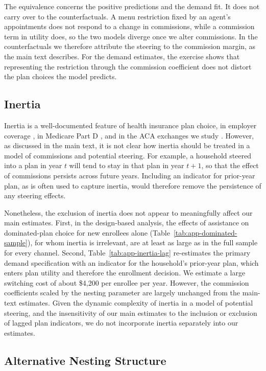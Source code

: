 \documentclass[12pt]{article}
\begin{document}
The equivalence concerns the positive predictions and the demand fit. It does not carry over to the counterfactuals. A menu restriction fixed by an agent's appointments does not respond to a change in commissions, while a commission term in utility does, so the two models diverge once we alter commissions. In the counterfactuals we therefore attribute the steering to the commission margin, as the main text describes. For the demand estimates, the exercise shows that representing the restriction through the commission coefficient does not distort the plan choices the model predicts.

\subsection{Inertia}
\label{app:inertia}

Inertia is a well-documented feature of health insurance plan choice, in employer coverage \citep{handel2013}, in Medicare Part D \citep{polyakova2016}, and in the ACA exchanges we study \citep{saltzman2025}. However, as discussed in the main text, it is not clear how inertia should be treated in a model of commissions and potential steering. For example, a household steered into a plan in year $t$ will tend to stay in that plan in year $t+1$, so that the effect of commissions persists across future years. Including an indicator for prior-year plan, as is often used to capture inertia, would therefore remove the persistence of any steering effects.

Nonetheless, the exclusion of inertia does not appear to meaningfully affect our main estimates. First, in the design-based analysis, the effects of assistance on dominated-plan choice for new enrollees alone (Table~\ref{tab:app-dominated-sample}), for whom inertia is irrelevant, are at least as large as in the full sample for every channel. Second, Table~\ref{tab:app-inertia-lag} re-estimates the primary demand specification with an indicator for the household's prior-year plan, which enters plan utility and therefore the enrollment decision. We estimate a large switching cost of about \$4,200 per enrollee per year. However, the commission coefficients scaled by the nesting parameter are largely unchanged from the main-text estimates. Given the dynamic complexity of inertia in a model of potential steering, and the insensitivity of our main estimates to the inclusion or exclusion of lagged plan indicators, we do not incorporate inertia separately into our estimates.

\subsection{Alternative Nesting Structure}
\label{app:alt-nest}
\end{document}
